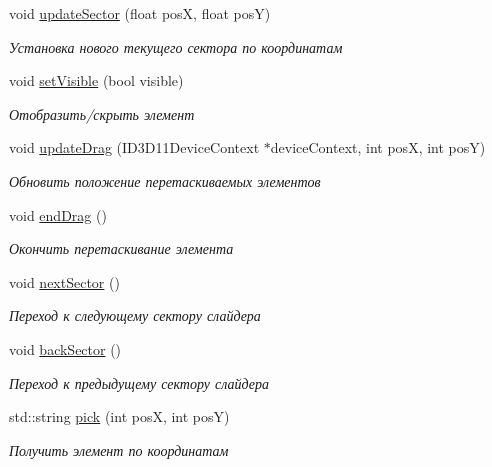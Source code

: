\begin{DoxyCompactItemize}
void \hyperlink{class_slider_element_class_a94456248dbf58f805964a456e7c62424}{update\+Sector} (float posX, float posY)
\begin{DoxyCompactList}\small\item\em Установка нового текущего сектора по координатам \end{DoxyCompactList}\item 
void \hyperlink{class_slider_element_class_a454f7659d2a5cac808115a77d409fbf6}{set\+Visible} (bool visible)
\begin{DoxyCompactList}\small\item\em Отобразить/скрыть элемент \end{DoxyCompactList}\item 
void \hyperlink{class_slider_element_class_a9047a46ab94c4bf702ba5507720c38ae}{update\+Drag} (I\+D3\+D11\+Device\+Context $\ast$device\+Context, int posX, int posY)
\begin{DoxyCompactList}\small\item\em Обновить положение перетаскиваемых элементов \end{DoxyCompactList}\item 
void \hyperlink{class_slider_element_class_a95fc13291bdbe865cb169e94b88092c8}{end\+Drag} ()
\begin{DoxyCompactList}\small\item\em Окончить перетаскивание элемента \end{DoxyCompactList}\item 
void \hyperlink{class_slider_element_class_a87957575c42790af2b0103ac459d4f37}{next\+Sector} ()
\begin{DoxyCompactList}\small\item\em Переход к следующему сектору слайдера \end{DoxyCompactList}\item 
void \hyperlink{class_slider_element_class_a4866508a0ef1ade9a3eb09ba00f06577}{back\+Sector} ()
\begin{DoxyCompactList}\small\item\em Переход к предыдущему сектору слайдера \end{DoxyCompactList}\item 
std\+::string \hyperlink{class_slider_element_class_a7f09508006fbf9e6aee6c3c0e8b059ed}{pick} (int posX, int posY)
\begin{DoxyCompactList}\small\item\em Получить элемент по координатам \end{DoxyCompactList}\item 

\end{DoxyCompactItemize}
